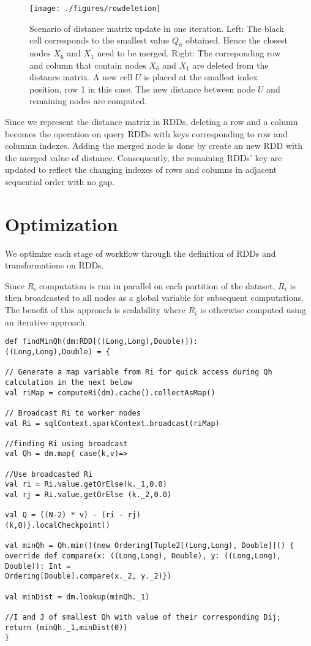 \begin{figure}
\begin{center}
	\texttt{[image: ./figures/rowdeletion]}
	{\caption{Scenario of distance matrix update in one iteration. Left: The black cell corresponds to the smallest value $Q_h$ obtained. Hence the closest nodes $X_6$ and $X_1$ need to be merged. Right: The correponding row and column that contain nodes $X_6$ and $X_1$  are deleted from the distance matrix. A new cell $U$ is placed at the smallest index position, row 1 in this case. The new distance between node $U$ and remaining nodes are computed.}
		\label{fig:reducing-dimension}}
		\end{center}
\end{figure}

Since we represent the distance matrix in RDDs, deleting a row and a column becomes the operation on query RDDs with keys corresponding to row and colunmn indexes. Adding the merged node is done by create an new RDD with the merged value of distance. Consequently, the remaining RDDs' key are updated to reflect the changing indexes of rows and columns in adjacent sequential order with no gap.  

\section{Optimization}
We optimize each stage of workflow through the definition of RDDs and transformations on RDDs.

Since $R_i$ computation is run in parallel on each partition of the dataset, $R_i$ is then broadcasted to all nodes as a global variable for subsequent computations. The benefit of this approach is scalability where $R_i$ is otherwise computed using an iterative approach.

\begin{lstlisting}[style=myScalastyle,caption={Finding two closest nodes with a broadcast  variable},captionpos=b]
def findMinQh(dm:RDD[((Long,Long),Double)]):
((Long,Long),Double) = {

// Generate a map variable from Ri for quick access during Qh calculation in the next below
val riMap = computeRi(dm).cache().collectAsMap()

// Broadcast Ri to worker nodes
val Ri = sqlContext.sparkContext.broadcast(riMap)

//finding Ri using broadcast
val Qh = dm.map{ case(k,v)=>

//Use broadcasted Ri 
val ri = Ri.value.getOrElse(k._1,0.0) 
val rj = Ri.value.getOrElse (k._2,0.0)

val Q = ((N-2) * v) - (ri - rj)
(k,Q)}.localCheckpoint()

val minQh = Qh.min()(new Ordering[Tuple2[(Long,Long), Double]]() {
override def compare(x: ((Long,Long), Double), y: ((Long,Long), Double)): Int =
Ordering[Double].compare(x._2, y._2)})

val minDist = dm.lookup(minQh._1)

//I and J of smallest Qh with value of their corresponding Dij; 
return (minQh._1,minDist(0))
}
\end{lstlisting}


